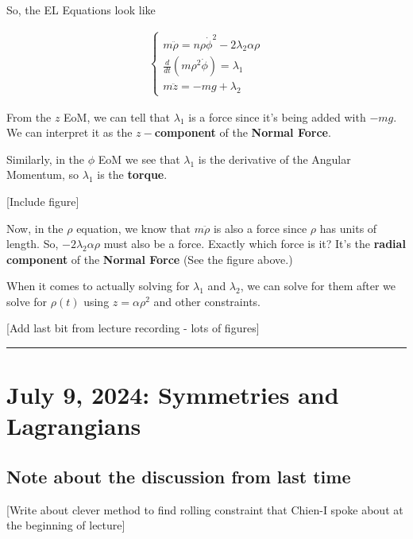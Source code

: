 \documentclass[11pt]{article}
\begin{document}
So, the EL Equations look like 

\begin{align*}
  \begin{cases}
    m \ddot{\rho} = n\rho \dot{\phi}^2 - 2 \lambda_2 \alpha \rho \\
    \frac{d}{dt} \left( m \rho^2 \dot{\phi} \right) = \lambda_1 \\
    m \ddot{z} = -mg + \lambda_2 
  \end{cases}
\end{align*}

\vskip 0.5cm
\begin{redbox}
  From the $z$ EoM, we can tell that $\lambda_1$ is a force since it's being added with $-mg$. We can interpret it as the \textbf{$z-$component} of the \textbf{Normal Force}.

  \vskip 0.5cm
  Similarly, in the $\phi$ EoM we see that $\lambda_1$ is the derivative of the Angular Momentum, so $\lambda_1$ is the \textbf{torque}.
\end{redbox}

[Include figure]

\begin{redbox}
  Now, in the $\rho$ equation, we know that $m\ddot{\rho}$ is also a force since $\rho$ has units of length. So, $-2\lambda_2 \alpha \rho$ must also be a force. Exactly which force is it? It's the \textbf{radial component} of the \textbf{Normal Force} (See the figure above.)
\end{redbox}

\vskip 0.5cm
\begin{bluebox}
  When it comes to actually solving for $\lambda_1$ and $\lambda_2$, we can solve for them after we solve for $\rho(t)$ using $z = \alpha \rho^2$ and other constraints.
\end{bluebox}

\vskip 0.5cm
[Add last bit from lecture recording - lots of figures]
\hrule

\pagebreak
\section{July 9, 2024: Symmetries and Lagrangians}

\subsection{Note about the discussion from last time}
[Write about clever method to find rolling constraint that Chien-I spoke about at the beginning of lecture]
\end{document}

